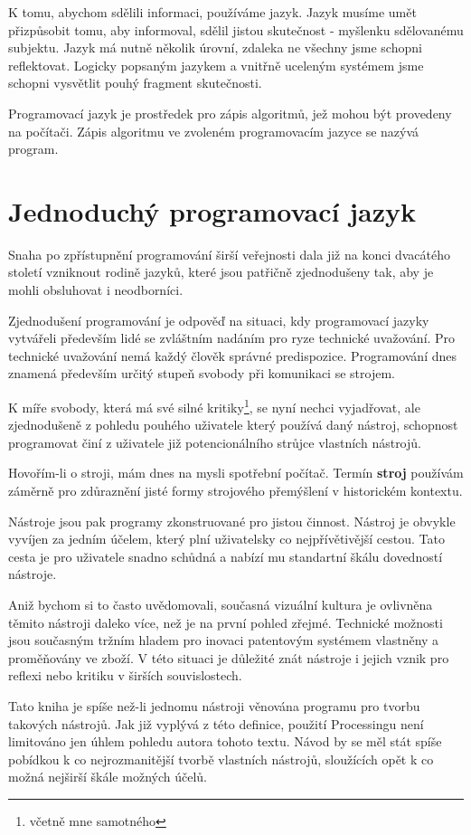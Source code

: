 \documentclass[10pt]{book}
\newcommand{\oddil}[1]{\section{#1}\index{#1}\label{#1}}
\newcommand{\slovnik}[1]{\textbf{\gls{#1}}\index{#1}\label{#1}}
\begin{document}
K tomu, abychom sdělili informaci, používáme jazyk. Jazyk musíme umět přizpůsobit tomu, aby informoval, sdělil jistou skutečnost - myšlenku sdělovanému subjektu. Jazyk má nutně několik úrovní, zdaleka ne všechny jsme schopni reflektovat. Logicky popsaným jazykem a vnitřně uceleným systémem jsme schopni vysvětlit pouhý fragment skutečnosti.

Programovací jazyk je prostředek pro zápis algoritmů, jež mohou být provedeny na počítači. Zápis algoritmu ve zvoleném programovacím jazyce se nazývá program.





\oddil{Jednoduchý programovací jazyk}

Snaha po  zpřístupnění programování širší veřejnosti dala již na konci dvacátého století vzniknout rodině jazyků, které jsou patřičně zjednodušeny tak, aby je mohli obsluhovat i neodborníci.

Zjednodušení programování je odpověď na situaci, kdy programovací jazyky vytvářeli především lidé se zvláštním nadáním pro ryze technické uvažování. Pro technické uvažování nemá každý člověk správné predispozice. Programování dnes znamená především určitý stupeň svobody při komunikaci se strojem.

K míře svobody, která má své silné kritiky\footnote{včetně mne samotného}, se nyní nechci vyjadřovat, ale zjednodušeně z pohledu pouhého uživatele který používá daný nástroj, schopnost programovat činí z uživatele již potencionálního strůjce vlastních nástrojů.

Hovořím-li o stroji, mám dnes na mysli spotřební počítač. Termín \slovnik{stroj} používám záměrně pro zdůraznění jisté formy strojového přemýšlení v historickém kontextu.

Nástroje jsou pak programy zkonstruované pro jistou činnost. Nástroj je obvykle vyvíjen za jedním účelem, který plní uživatelsky co nejpřívětivější cestou. Tato cesta je pro uživatele snadno schůdná a nabízí mu standartní škálu dovedností nástroje.

Aniž bychom si to často uvědomovali, současná vizuální kultura je ovlivněna těmito nástroji daleko více, než je na první pohled zřejmé. Technické možnosti jsou současným tržním hladem pro inovaci patentovým systémem vlastněny a proměňovány ve zboží. V této situaci je důležité znát nástroje i jejich vznik pro reflexi nebo kritiku v širších souvislostech.

Tato kniha je spíše než-li jednomu nástroji věnována programu pro tvorbu takových nástrojů. Jak již vyplývá z této definice, použití Processingu není limitováno jen úhlem pohledu autora tohoto textu. Návod by se měl stát spíše pobídkou k co nejrozmanitější tvorbě vlastních nástrojů, sloužících opět k co možná nejširší škále možných účelů.
\end{document}
